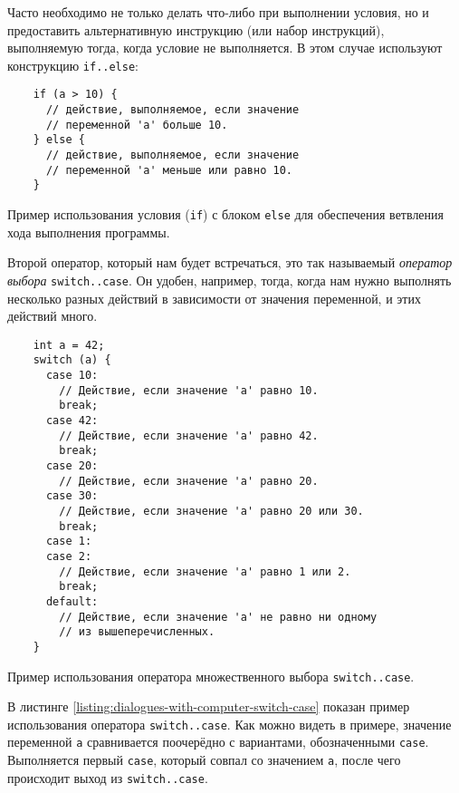 \documentclass[../sparc.tex]{subfiles}
\begin{document}
Часто необходимо не только делать что-либо при выполнении условия, но и
предоставить альтернативную инструкцию (или набор инструкций), выполняемую
тогда, когда условие не выполняется.  В этом случае используют конструкцию
\texttt{if..else}:

\begin{listing}[ht]
  \begin{verbatim}
    if (a > 10) {
      // действие, выполняемое, если значение
      // переменной 'a' больше 10.
    } else {
      // действие, выполняемое, если значение
      // переменной 'a' меньше или равно 10.
    }
  \end{verbatim}
  \label{listing:dialogues-with-computer-if-with-else}
  \caption{Пример использования условия (\texttt{if}) с блоком \texttt{else} для
    обеспечения ветвления хода выполнения программы.}
\end{listing}

Второй оператор, который нам будет встречаться, это так называемый
\emph{оператор выбора} \texttt{switch..case}.  Он удобен, например, тогда, когда
нам нужно выполнять несколько разных действий в зависимости от значения
переменной, и этих действий много.

\begin{listing}[ht]
  \begin{verbatim}
    int a = 42;
    switch (a) {
      case 10:
        // Действие, если значение 'a' равно 10.
        break;
      case 42:
        // Действие, если значение 'a' равно 42.
        break;
      case 20:
        // Действие, если значение 'a' равно 20.
      case 30:
        // Действие, если значение 'a' равно 20 или 30.
        break;
      case 1:
      case 2:
        // Действие, если значение 'a' равно 1 или 2.
        break;
      default:
        // Действие, если значение 'a' не равно ни одному
        // из вышеперечисленных.
    }
  \end{verbatim}
  \label{listing:dialogues-with-computer-switch-case}
  \caption{Пример использования оператора множественного выбора
    \texttt{switch..case}.}
\end{listing}

В листинге \ref{listing:dialogues-with-computer-switch-case} показан пример
использования оператора \texttt{switch..case}.  Как можно видеть в примере,
значение переменной \texttt{a} сравнивается поочерёдно с вариантами,
обозначенными \texttt{case}.  Выполняется первый \texttt{case}, который совпал
со значением \texttt{a}, после чего происходит выход из \texttt{switch..case}.
\end{document}
